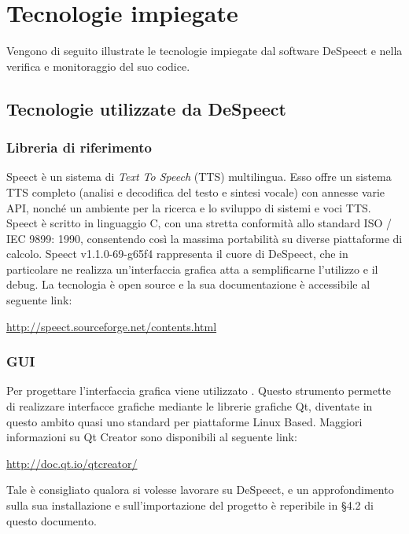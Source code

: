 \documentclass[openany,12pt,a4paper]{report}
\begin{document}
	\chapter{Tecnologie impiegate}
	
	Vengono di seguito illustrate le tecnologie impiegate dal software DeSpeect e nella verifica e monitoraggio del suo codice.
	
	\section{Tecnologie utilizzate da DeSpeect}
	
	\subsection{Libreria di riferimento}
	Speect è un sistema di \textit{Text To Speech} (TTS) multilingua. Esso offre un sistema TTS completo (analisi e decodifica del testo e sintesi vocale) con annesse varie API, nonché un ambiente per la ricerca e lo sviluppo di sistemi e voci TTS. Speect è scritto in linguaggio C, con una stretta conformità allo standard ISO / IEC 9899: 1990, consentendo così la massima portabilità su diverse piattaforme di calcolo. Speect v1.1.0-69-g65f4 rappresenta il cuore di DeSpeect, che in particolare ne realizza un'interfaccia grafica atta a semplificarne l'utilizzo e il debug. La tecnologia è open source e la sua documentazione è accessibile al seguente link:
	\begin{center}
	\url{http://speect.sourceforge.net/contents.html}
	\end{center}
	
	\subsection{GUI}
	
	Per progettare l'interfaccia grafica viene utilizzato . Questo strumento permette di realizzare interfacce grafiche mediante le librerie grafiche Qt, diventate in questo ambito quasi uno standard per piattaforme Linux Based.  Maggiori informazioni su Qt Creator sono disponibili al seguente link:
	\begin{center}
		\centerline{\url{http://doc.qt.io/qtcreator/}}
	\end{center}
	Tale  è consigliato qualora si volesse lavorare su DeSpeect, e un approfondimento sulla sua installazione e sull'importazione del progetto è reperibile in §4.2 di questo documento.
	
\end{document}
